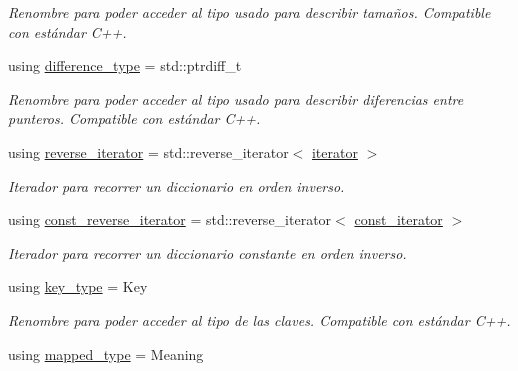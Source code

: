 \begin{DoxyCompactItemize}
\begin{DoxyCompactList}\small\item\em Renombre para poder acceder al tipo usado para describir tamaños. Compatible con estándar C++. \end{DoxyCompactList}\item 
\mbox{\label{classaed2_1_1map_a2f55b88809000fcbfce1c6cfef1ba74d}} 
using \hyperlink{classaed2_1_1map_a2f55b88809000fcbfce1c6cfef1ba74d}{difference\+\_\+type} = std\+::ptrdiff\+\_\+t
\begin{DoxyCompactList}\small\item\em Renombre para poder acceder al tipo usado para describir diferencias entre punteros. Compatible con estándar C++. \end{DoxyCompactList}\item 
using \hyperlink{classaed2_1_1map_a8e6a592062260177fd73b2f9897b1dd5}{reverse\+\_\+iterator} = std\+::reverse\+\_\+iterator$<$ \hyperlink{classaed2_1_1map_1_1iterator}{iterator} $>$
\begin{DoxyCompactList}\small\item\em Iterador para recorrer un diccionario en orden inverso. \end{DoxyCompactList}\item 
using \hyperlink{classaed2_1_1map_aed66a216549d13078a3ea6978ea0b768}{const\+\_\+reverse\+\_\+iterator} = std\+::reverse\+\_\+iterator$<$ \hyperlink{classaed2_1_1map_1_1const__iterator}{const\+\_\+iterator} $>$
\begin{DoxyCompactList}\small\item\em Iterador para recorrer un diccionario constante en orden inverso. \end{DoxyCompactList}\item 
\mbox{\label{classaed2_1_1map_a4273e8812e7105a618df58a2c8b72b7d}} 
using \hyperlink{classaed2_1_1map_a4273e8812e7105a618df58a2c8b72b7d}{key\+\_\+type} = Key
\begin{DoxyCompactList}\small\item\em Renombre para poder acceder al tipo de las claves. Compatible con estándar C++. \end{DoxyCompactList}\item 
\mbox{\label{classaed2_1_1map_aa3e34bf624f3009884a71b18f4ddae40}} 
using \hyperlink{classaed2_1_1map_aa3e34bf624f3009884a71b18f4ddae40}{mapped\+\_\+type} = Meaning

\end{DoxyCompactItemize}
